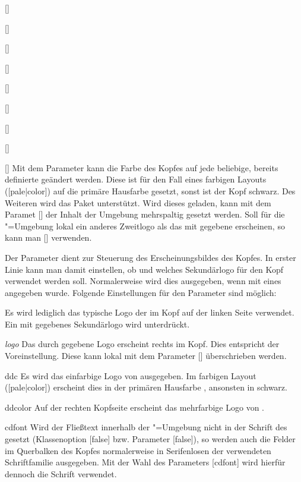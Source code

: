 \documentclass[%
  english,ngerman,%
  headings=optiontoheadandtoc,captions=tableheading,numbers=noenddot,%
  chapterpage,cdfoot,%
]{tudscrman}
\begin{document}
\begin{Declaration}{[]}
\begin{Declaration}{[]}
\begin{Declaration}{[\PSet]}
\begin{Declaration}{[]}
\begin{Declaration}{[]}
\begin{Declaration}{[\PBoolean]}
\begin{Declaration}{[\PSet]}
\begin{Declaration}{[\PSet]}
\begin{Declaration}{[]}
Mit dem Parameter  kann die Farbe des Kopfes 
auf jede beliebige, bereits definierte geändert werden. Diese ist für den Fall 
eines farbigen Layouts ([pale|color]) auf die primäre Hausfarbe 
 gesetzt, sonst ist der Kopf schwarz. Des Weiteren wird das Paket 
 unterstützt. Wird dieses geladen, kann mit dem Paramet 
[] der Inhalt der Umgebung 
mehrspaltig gesetzt werden. Soll für die "=Umgebung lokal 
ein anderes Zweitlogo als das mit  gegebene erscheinen, so 
kann man [] verwenden.

Der Parameter  dient zur Steuerung des 
Erscheinungsbildes des Kopfes. In erster Linie kann man damit einstellen, ob und 
welches Sekundärlogo für den Kopf verwendet werden soll. Normalerweise wird dies 
ausgegeben, wenn mit  eines angegeben wurde. Folgende 
Einstellungen für den Parameter  sind möglich:
%
\begin{values}
\itemfalse Es wird lediglich das typische Logo der \TnUD im Kopf auf der linken 
  Seite verwendet. Ein mit  gegebenes Sekundärlogo wird 
  unterdrückt.
\item[\noexpand\emph{logo}]Das durch  gegebene Logo 
  erscheint rechts im Kopf. Dies entspricht der Voreinstellung. Diese kann lokal 
  mit dem Parameter [] 
  überschrieben werden.
\item[ddc] Es wird das einfarbige Logo von \DDC ausgegeben. Im farbigen Layout
  ([pale|color]) erscheint dies in der primären Hausfarbe 
  , ansonsten in schwarz.
\item[ddcolor] Auf der rechten Kopfseite erscheint das mehrfarbige Logo von \DDC.
\item[cdfont] Wird der Fließtext innerhalb der "=Umgebung
  nicht in der Schrift des \CDs gesetzt (Klassenoption [false] 
  bzw. Parameter [false]), so werden auch 
  die Felder im Querbalken des Kopfes normalerweise in Serifenlosen der 
  verwendeten Schriftfamilie ausgegeben. Mit der Wahl des Parameters 
  [cdfont] wird hierfür dennoch die Schrift 
  \Univers verwendet.
\end{values}
%

\end{Declaration}
\end{Declaration}
\end{Declaration}
\end{Declaration}
\end{Declaration}
\end{Declaration}
\end{Declaration}
\end{Declaration}
\end{Declaration}
\end{document}
